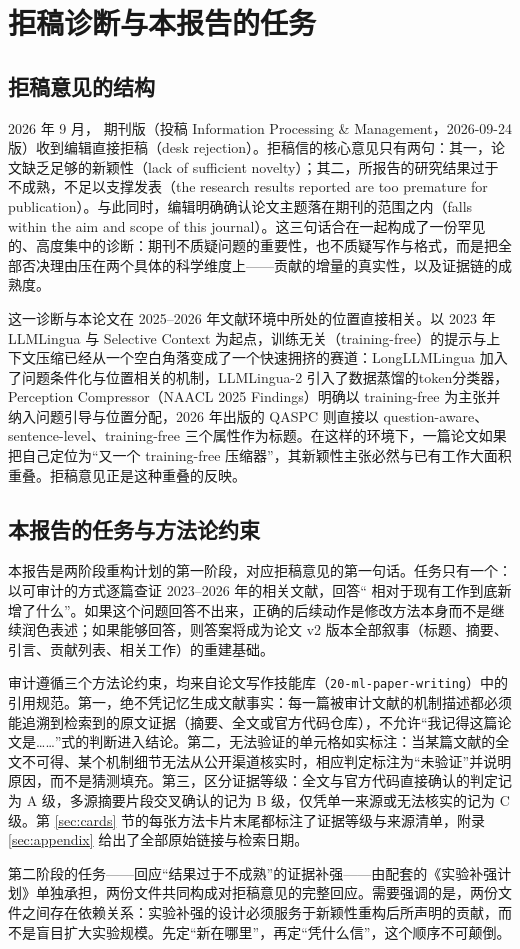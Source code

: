 \section{拒稿诊断与本报告的任务}

\subsection{拒稿意见的结构}

2026 年 9 月，\sieve{} 期刊版（投稿 Information Processing \& Management，2026-09-24 版）收到编辑直接拒稿（desk rejection）。拒稿信的核心意见只有两句：其一，论文缺乏足够的新颖性（lack of sufficient novelty）；其二，所报告的研究结果过于不成熟，不足以支撑发表（the research results reported are too premature for publication）。与此同时，编辑明确确认论文主题落在期刊的范围之内（falls within the aim and scope of this journal）。这三句话合在一起构成了一份罕见的、高度集中的诊断：期刊不质疑问题的重要性，也不质疑写作与格式，而是把全部否决理由压在两个具体的科学维度上——贡献的增量的真实性，以及证据链的成熟度。

这一诊断与本论文在 2025--2026 年文献环境中所处的位置直接相关。以 2023 年 LLMLingua 与 Selective Context 为起点，训练无关（training-free）的提示与上下文压缩已经从一个空白角落变成了一个快速拥挤的赛道：LongLLMLingua 加入了问题条件化与位置相关的机制，LLMLingua-2 引入了数据蒸馏的token分类器，Perception Compressor（NAACL 2025 Findings）明确以 training-free 为主张并纳入问题引导与位置分配，2026 年出版的 QASPC 则直接以 question-aware、sentence-level、training-free 三个属性作为标题。在这样的环境下，一篇论文如果把自己定位为``又一个 training-free 压缩器''，其新颖性主张必然与已有工作大面积重叠。拒稿意见正是这种重叠的反映。

\subsection{本报告的任务与方法论约束}

本报告是两阶段重构计划的第一阶段，对应拒稿意见的第一句话。任务只有一个：以可审计的方式逐篇查证 2023--2026 年的相关文献，回答``\sieve{} 相对于现有工作到底新增了什么''。如果这个问题回答不出来，正确的后续动作是修改方法本身而不是继续润色表述；如果能够回答，则答案将成为论文 v2 版本全部叙事（标题、摘要、引言、贡献列表、相关工作）的重建基础。

审计遵循三个方法论约束，均来自论文写作技能库（\texttt{20-ml-paper-writing}）中的引用规范。第一，绝不凭记忆生成文献事实：每一篇被审计文献的机制描述都必须能追溯到检索到的原文证据（摘要、全文或官方代码仓库），不允许``我记得这篇论文是\dots\dots''式的判断进入结论。第二，无法验证的单元格如实标注：当某篇文献的全文不可得、某个机制细节无法从公开渠道核实时，相应判定标注为``未验证''并说明原因，而不是猜测填充。第三，区分证据等级：全文与官方代码直接确认的判定记为 A 级，多源摘要片段交叉确认的记为 B 级，仅凭单一来源或无法核实的记为 C 级。第 \ref{sec:cards} 节的每张方法卡片末尾都标注了证据等级与来源清单，附录 \ref{sec:appendix} 给出了全部原始链接与检索日期。

第二阶段的任务——回应``结果过于不成熟''的证据补强——由配套的《实验补强计划》单独承担，两份文件共同构成对拒稿意见的完整回应。需要强调的是，两份文件之间存在依赖关系：实验补强的设计必须服务于新颖性重构后所声明的贡献，而不是盲目扩大实验规模。先定``新在哪里''，再定``凭什么信''，这个顺序不可颠倒。
